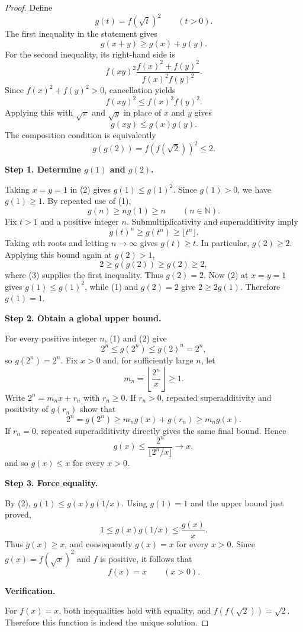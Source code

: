 
\begin{dlsummary}[title={\bfseries Solution 23. The Euclidean--Multiplicative Squeeze},breakable]

\begin{proof}
Define
\[
g(t)=f(\sqrt t)^2\qquad(t>0).
\]
The first inequality in the statement gives
\[
g(x+y)\geq g(x)+g(y). \tag{1}
\]
For the second inequality, its right-hand side is
\[
f(xy)^2\frac{f(x)^2+f(y)^2}{f(x)^2f(y)^2}.
\]
Since $f(x)^2+f(y)^2>0$, cancellation yields
\[
f(xy)^2\leq f(x)^2f(y)^2.
\]
Applying this with $\sqrt x$ and $\sqrt y$ in place of $x$ and $y$ gives
\[
g(xy)\leq g(x)g(y). \tag{2}
\]
The composition condition is equivalently
\[
g(g(2))=f(f(\sqrt2))^2\leq2. \tag{3}
\]

\medskip
\noindent
\textbf{Step 1. Determine $g(1)$ and $g(2)$.}

Taking $x=y=1$ in (2) gives $g(1)\leq g(1)^2$. Since $g(1)>0$,
we have $g(1)\geq1$. By repeated use of (1),
\[
g(n)\geq n g(1)\geq n\qquad(n\in\mathbb N).
\]
Fix $t>1$ and a positive integer $n$. Submultiplicativity and
superadditivity imply
\[
g(t)^n\geq g(t^n)\geq\lfloor t^n\rfloor.
\]
Taking $n$th roots and letting $n\to\infty$ gives $g(t)\geq t$.
In particular, $g(2)\geq2$. Applying this bound again at $g(2)>1$,
\[
2\geq g(g(2))\geq g(2)\geq2,
\]
where (3) supplies the first inequality. Thus $g(2)=2$. Now (2) at
$x=y=1$ gives $g(1)\leq g(1)^2$, while (1) and $g(2)=2$ give
$2\geq2g(1)$. Therefore $g(1)=1$.

\medskip
\noindent
\textbf{Step 2. Obtain a global upper bound.}

For every positive integer $n$, (1) and (2) give
\[
2^n\leq g(2^n)\leq g(2)^n=2^n,
\]
so $g(2^n)=2^n$. Fix $x>0$ and, for sufficiently large $n$, let
\[
m_n=\left\lfloor\frac{2^n}{x}\right\rfloor\geq1.
\]
Write $2^n=m_nx+r_n$ with $r_n\geq0$. If $r_n>0$, repeated
superadditivity and positivity of $g(r_n)$ show that
\[
2^n=g(2^n)\geq m_ng(x)+g(r_n)\geq m_ng(x).
\]
If $r_n=0$, repeated superadditivity directly gives the same final
bound. Hence
\[
g(x)\leq\frac{2^n}{\lfloor 2^n/x\rfloor}\longrightarrow x,
\]
and so $g(x)\leq x$ for every $x>0$.

\medskip
\noindent
\textbf{Step 3. Force equality.}

By (2), $g(1)\leq g(x)g(1/x)$. Using $g(1)=1$ and the upper bound
just proved,
\[
1\leq g(x)g(1/x)\leq\frac{g(x)}x.
\]
Thus $g(x)\geq x$, and consequently $g(x)=x$ for every $x>0$.
Since $g(x)=f(\sqrt x)^2$ and $f$ is positive, it follows that
\[
f(x)=x\qquad(x>0).
\]

\medskip
\noindent
\textbf{Verification.}

For $f(x)=x$, both inequalities hold with equality, and
$f(f(\sqrt2))=\sqrt2$. Therefore this function is indeed the unique
solution.
\end{proof}

\end{dlsummary}